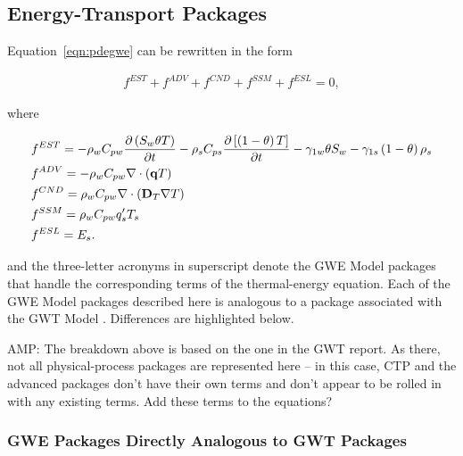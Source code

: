 \subsection{Energy-Transport Packages} \label{sec:packages}

\noindent Equation~\ref{eqn:pdegwe} can be rewritten in the form

\begin{equation}
\label{eqn:pdegwefterms}
\begin{aligned}
f^{EST} + f^{ADV} + f^{CND} + f^{SSM} + f^{ESL} = 0,
\end{aligned}
\end{equation}

\noindent where

\begin{equation}
\label{eqn:fterms}
\begin{aligned}
& f^{EST} = - \rho_w C_{pw} \frac {\partial \left ( S_w \theta T \right )}{\partial t}
- \rho_s C_{ps} \frac {\partial \left [ \left (1 - \theta \right ) T \right ]}{\partial t}
- \gamma_{1w} \theta S_w - \gamma_{1s} \left (1 - \theta \right ) \rho_s \\
& f^{ADV} = - \rho_w C_{pw} \nabla \cdot \left ( \mathbf{q} T  \right ) \\
& f^{CND} =  \rho_w C_{pw} \nabla \cdot \left ( \mathbf{D}_T \nabla T \right ) \\
& f^{SSM} = \rho_w C_{pw} q'_s T_s \\
& f^{ESL} = E_s.
\end{aligned}
\end{equation}

\noindent and the three-letter acronyms in superscript denote the GWE Model packages that handle the corresponding terms of the thermal-energy equation. Each of the GWE Model packages described here is analogous to a package associated with the GWT Model \citep{modflow6gwt}. Differences are highlighted below.

{\color{red} AMP: The breakdown above is based on the one in the GWT report. As there, not all physical-process packages are represented here -- in this case, CTP and the advanced packages don't have their own terms and don't appear to be rolled in with any existing terms. Add these terms to the equations?}

\subsubsection{GWE Packages Directly Analogous to GWT Packages}

